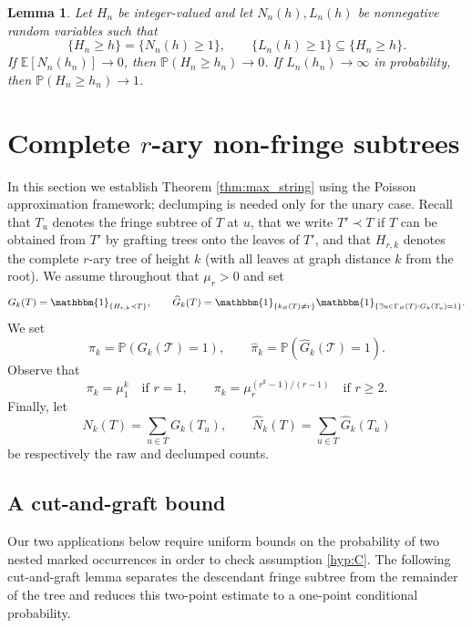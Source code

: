 \documentclass[a4paper,11pt]{article}
\newtheorem{lemma}[theorem]{Lemma}
\newcommand{\E}{\mathbb{E}}
\DeclareRobustCommand{\P}{\mathbb{P}}
\DeclareRobustCommand{\1}{\mathbf{1}}
\begin{document}
\begin{lemma}
\label{lem:ineqs}
Let $H_n$ be integer-valued and let $N_n(h),L_n(h)$ be nonnegative random
variables such that
$$
\{H_n\ge h\}=\{N_n(h)\ge1\},
\qquad
\{L_n(h)\ge1\}\subseteq\{H_n\ge h\}.
$$
If $\E[N_n(h_n)]\to0$, then $\P(H_n\ge h_n)\to0$. If
$L_n(h_n)\to\infty$ in probability, then $\P(H_n\ge h_n)\to1$.
\end{lemma}



\section{Complete $r$-ary non-fringe subtrees}
\label{sec:rary}


In this section we establish Theorem \ref{thm:max_string} using the Poisson
approximation framework; declumping is needed only for the unary case. Recall
that $T_u$ denotes the fringe subtree of $T$ at $u$, that we write
$T'\prec T$ if $T$ can be obtained from $T'$ by grafting trees onto the leaves
of $T'$, and that $H_{r,k}$ denotes the complete $r$-ary tree of height $k$ (with all leaves at graph distance $k$ from the root).
We assume throughout that $\mu_r>0$ and set
$$
  G_k(T)=\mathbbm{1}_{\{H_{r,k}\prec T\}},
  \qquad
  \widehat{G}_k(T)
  =
  \mathbbm{1}_{\{k_\varnothing(T)\neq r\}}
  \mathbbm{1}_{\{\exists u\in\Gamma_\varnothing(T):G_k(T_u)=1\}}.
$$
We set
$$
  \pi_k=\P(G_k(\mathcal T)=1),
  \qquad
  \widehat{\pi}_k=\P(\widehat{G}_k(\mathcal T)=1).
$$
Observe that
$$
  \pi_k=\mu_1^k
  \quad \textrm{if } r=1,
  \qquad
  \pi_k=\mu_r^{(r^k-1)/(r-1)}
  \quad \textrm{if } r\ge2.
$$
Finally, let
$$
  N_k(T)=\sum_{u\in T}G_k(T_u),
  \qquad
  \widehat{N}_k(T)=\sum_{u\in T}\widehat{G}_k(T_u)
$$
be respectively the raw and declumped counts.





\subsection{A cut-and-graft bound}

Our two applications below require uniform bounds on the probability of two
nested marked occurrences in order to check assumption \ref{hyp:C}. The following cut-and-graft lemma separates the
descendant fringe subtree from the remainder of the tree and reduces this
two-point estimate to a one-point conditional probability.
\end{document}
